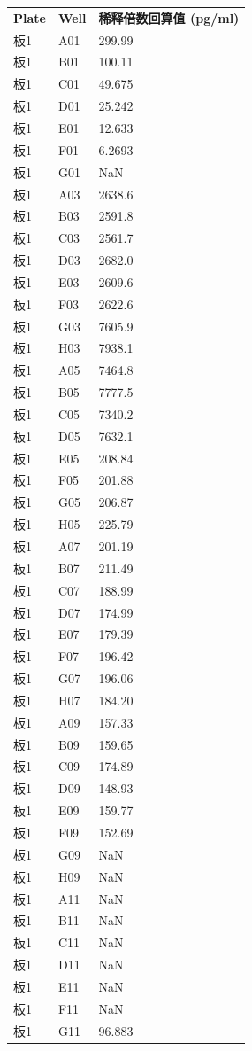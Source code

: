 \documentclass[UTF8,10pt,a4paper,fontset=fandol]{ctexart}
\begin{document}
\begin{tabular}{@{}lll@{}}
\textbf{Plate} & \textbf{Well} & \textbf{稀释倍数回算值 (pg/ml)}\\
板1 & A01 & 299.99\\
板1 & B01 & 100.11\\
板1 & C01 & 49.675\\
板1 & D01 & 25.242\\
板1 & E01 & 12.633\\
板1 & F01 & 6.2693\\
板1 & G01 & NaN\\
板1 & A03 & 2638.6\\
板1 & B03 & 2591.8\\
板1 & C03 & 2561.7\\
板1 & D03 & 2682.0\\
板1 & E03 & 2609.6\\
板1 & F03 & 2622.6\\
板1 & G03 & 7605.9\\
板1 & H03 & 7938.1\\
板1 & A05 & 7464.8\\
板1 & B05 & 7777.5\\
板1 & C05 & 7340.2\\
板1 & D05 & 7632.1\\
板1 & E05 & 208.84\\
板1 & F05 & 201.88\\
板1 & G05 & 206.87\\
板1 & H05 & 225.79\\
板1 & A07 & 201.19\\
板1 & B07 & 211.49\\
板1 & C07 & 188.99\\
板1 & D07 & 174.99\\
板1 & E07 & 179.39\\
板1 & F07 & 196.42\\
板1 & G07 & 196.06\\
板1 & H07 & 184.20\\
板1 & A09 & 157.33\\
板1 & B09 & 159.65\\
板1 & C09 & 174.89\\
板1 & D09 & 148.93\\
板1 & E09 & 159.77\\
板1 & F09 & 152.69\\
板1 & G09 & NaN\\
板1 & H09 & NaN\\
板1 & A11 & NaN\\
板1 & B11 & NaN\\
板1 & C11 & NaN\\
板1 & D11 & NaN\\
板1 & E11 & NaN\\
板1 & F11 & NaN\\
板1 & G11 & 96.883
\end{tabular}
\end{document}
